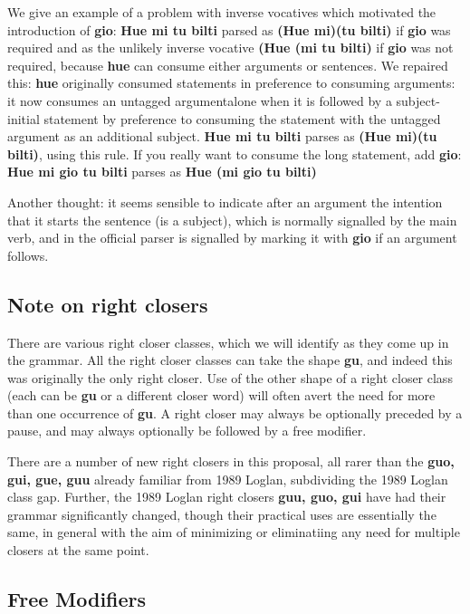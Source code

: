 \documentclass[12pt]{book}
\begin{document}
{We give an example of a problem with inverse vocatives which motivated the introduction of {\bf gio}: {\bf Hue mi tu bilti} parsed as {\bf (Hue mi)(tu bilti)} if {\bf gio} was required and as the unlikely inverse vocative 
\bf (Hue (mi tu bilti)} if {\bf gio} was not required, because {\bf hue} can consume either arguments or sentences.   We repaired this:  {\bf hue} originally consumed statements in preference to consuming arguments:  it now consumes an untagged argumentalone when it is followed by a subject-initial statement by preference to consuming the statement with the untagged argument as an additional subject.   {\bf Hue mi tu bilti} parses as {\bf (Hue mi)(tu bilti)}, using this rule.  If you really want to consume the long statement, add {\bf gio}:  {\bf Hue mi gio tu bilti} parses as  {\bf Hue (mi gio tu bilti)}

Another thought:  it seems sensible to indicate after an argument the intention that it starts the sentence (is a subject), which is normally signalled by the main verb, and in the official parser is signalled by marking it with {\bf gio} if an argument follows.


\subsection{Note on right closers}

There are various right closer classes, which we will identify as they come up in the grammar.  All the right closer classes can take the shape
{\bf gu}, and indeed this was originally the only right closer.  Use of the other shape of a right closer class (each can be {\bf gu} or a different closer word)  will often avert the need for
more than one occurrence of {\bf gu}.  A right closer may always be optionally preceded by a pause, and may always optionally be followed by a free modifier.

There are a number of new right closers in this proposal, all rarer than the {\bf guo, gui, gue, guu} already familiar from 1989 Loglan, subdividing the 1989 Loglan class gap.
Further, the 1989 Loglan right closers {\bf guu, guo, gui} have had their grammar significantly changed, though their practical uses are essentially the same, in general with the aim
of minimizing or eliminatiing any need for multiple closers at the same point.

\subsection{Free Modifiers}
\end{document}
